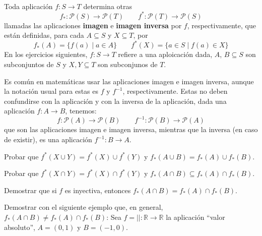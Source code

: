 \ \\
\noindent
Toda aplicación $f:S\to T$ determina otras
\begin{equation*}
    f_{*}:\mathcal{P}(S)\to\mathcal{P}(T)\qquad f^{*}:\mathcal{P}(T)\to \mathcal{P}(S)
\end{equation*}
llamadas las aplicaciones \textbf{imagen} e \textbf{imagen inversa} por $f$, respectivamente, que están definidas, para cada $A\subseteq S$ y $X\subseteq T$, por
\begin{equation*}
    f_{*}(A) = \{f(a) \mid a\in A\}\qquad f^{*}(X) = \{a\in S \mid f(a) \in X\}
\end{equation*}
En los ejercicios siguientes, $f:S\to T$ refiere a una aploicación dada, $A$, $B\subseteq S$ son subconjuntos de $S$ y $X, Y \subseteq T$ son subconjunos de $T$.
\begin{observacion}
    Es común en matemáticas usar las aplicaciones imagen e imagen inversa, aunque la notación usual para estas es $f$ y $f^{-1}$, respectivamente. Estas no deben confundirse con la aplicación y con la inversa de la aplicación, dada una aplicación $f:A\to B$, tenemos:
    \begin{equation*}
        f:\mathcal{P}(A)\to \mathcal{P}(B)\qquad f^{-1}:\mathcal{P}(B)\to \mathcal{P}(A)
    \end{equation*}
    que son las aplicaciones imagen e imagen inversa, mientras que la inversa (en caso de existir), es una aplicación $f^{-1}:B\to A$.
\end{observacion}

\begin{ejercicio}
    Probar que $f^{*}(X\cup Y)=f^*(X) \cup f^*(Y)$ y $f_*(A\cup B)=f_*(A)\cup f_*(B)$.
\end{ejercicio}

\begin{ejercicio}
    Probar que $f^*(X\cap Y) = f^*(X)\cap f^*(Y)$ y $f_*(A\cap B)\subseteq f_*(A)\cap f_*(B)$.
\end{ejercicio}

\begin{ejercicio}
    Demostrar que si $f$ es inyectiva, entonces $f_*(A\cap B)=f_*(A)\cap f_*(B)$.
\end{ejercicio}

\begin{ejercicio}
    Demostrar con el siguiente ejemplo que, en general, $f_*(A\cap B)\neq f_*(A)\cap f_*(B)$:\newline
    Sea $f=||:\mathbb{R}\to\mathbb{R}$ la aplicación ``valor absoluto'', $A=(0,1)$ y $B=(-1,0)$.
\end{ejercicio}

